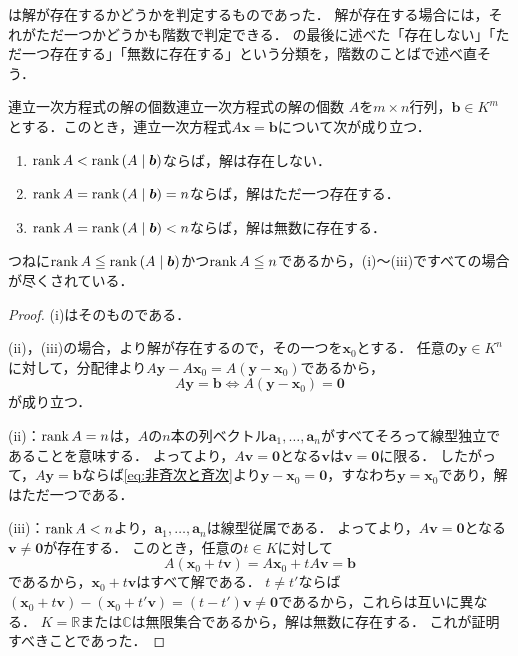 は解が存在するかどうかを判定するものであった．
解が存在する場合には，それがただ一つかどうかも階数で判定できる．
の最後に述べた「存在しない」「ただ一つ存在する」「無数に存在する」という分類を，階数のことばで述べ直そう．

\begin{theorem}{連立一次方程式の解の個数}{連立一次方程式の解の個数}
  $A$を$m \times n$行列，$\bm{b} \in K^m$とする．このとき，連立一次方程式$A\bm{x} = \bm{b}$について次が成り立つ．
  \begin{enumerate}[label=(\roman*),leftmargin=3.2em]
    \item $\operatorname{rank} A < \operatorname{rank}\,(A \mid \bm{b})$ならば，解は存在しない．
    \item $\operatorname{rank} A = \operatorname{rank}\,(A \mid \bm{b}) = n$ならば，解はただ一つ存在する．
    \item $\operatorname{rank} A = \operatorname{rank}\,(A \mid \bm{b}) < n$ならば，解は無数に存在する．
  \end{enumerate}
\end{theorem}

つねに$\operatorname{rank} A \leqq \operatorname{rank}\,(A \mid \bm{b})$かつ$\operatorname{rank} A \leqq n$であるから，(i)〜(iii)ですべての場合が尽くされている．

\begin{tleftbar}
\begin{proof}
  (i)はそのものである．

  (ii)，(iii)の場合，より解が存在するので，その一つを$\bm{x}_0$とする．
  任意の$\bm{y} \in K^n$に対して，分配律より$A\bm{y} - A\bm{x}_0 = A(\bm{y} - \bm{x}_0)$であるから，
  \begin{equation}
    A\bm{y} = \bm{b}
    \iff
    A(\bm{y} - \bm{x}_0) = \bm{0}
    \label{eq:非斉次と斉次}
  \end{equation}
  が成り立つ．

  (ii)：$\operatorname{rank} A = n$は，$A$の$n$本の列ベクトル$\bm{a}_1, \dots, \bm{a}_n$がすべてそろって線型独立であることを意味する．
  よってより，$A\bm{v} = \bm{0}$となる$\bm{v}$は$\bm{v} = \bm{0}$に限る．
  したがって，$A\bm{y} = \bm{b}$ならば\eqref{eq:非斉次と斉次}より$\bm{y} - \bm{x}_0 = \bm{0}$，すなわち$\bm{y} = \bm{x}_0$であり，解はただ一つである．

  (iii)：$\operatorname{rank} A < n$より，$\bm{a}_1, \dots, \bm{a}_n$は線型従属である．
  よってより，$A\bm{v} = \bm{0}$となる$\bm{v} \ne \bm{0}$が存在する．
  このとき，任意の$t \in K$に対して
  \[
    A(\bm{x}_0 + t\bm{v}) = A\bm{x}_0 + tA\bm{v} = \bm{b}
  \]
  であるから，$\bm{x}_0 + t\bm{v}$はすべて解である．
  $t \ne t'$ならば$(\bm{x}_0 + t\bm{v}) - (\bm{x}_0 + t'\bm{v}) = (t - t')\bm{v} \ne \bm{0}$であるから，これらは互いに異なる．
  $K = \mathbb{R}$または$\mathbb{C}$は無限集合であるから，解は無数に存在する．
  これが証明すべきことであった．
\end{proof}
\end{tleftbar}


